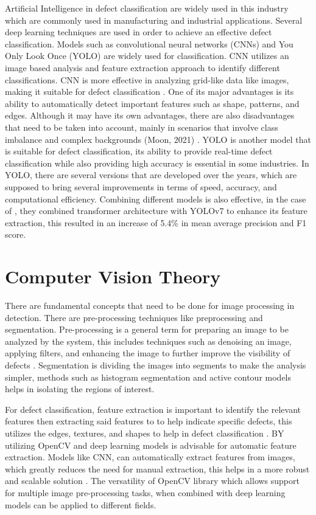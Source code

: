 Artificial Intelligence in defect classification are widely used in this industry which are commonly used in manufacturing and industrial applications. Several deep learning techniques are used in order to achieve an effective defect classification. Models such as convolutional neural networks (CNNs)  and You Only Look Once (YOLO) are widely used for classification. CNN utilizes an image based analysis and feature extraction approach to identify different classifications. CNN is more effective in analyzing grid-like data like images, making it suitable for defect classification \cite{Das_Hollander_Suliman_2019}. One of its major advantages is its ability to automatically detect important features such as shape, patterns, and edges. Although it may have its own advantages, there are also disadvantages that need to be taken into account, mainly in scenarios that involve class imbalance and complex backgrounds (Moon, 2021) . YOLO is another model that is suitable for defect classification, its ability to provide real-time defect classification while also providing high accuracy is essential in some industries. In YOLO, there are several versions that are developed over the years, which are supposed to bring several improvements in terms of speed, accuracy, and computational efficiency. Combining different models is also effective, in the case of \cite{Deepti_Prabadevi_2024}, they combined transformer architecture with YOLOv7 to enhance its feature extraction, this resulted in an increase of 5.4\% in mean average precision and F1 score. 

\section{Computer Vision Theory}

There are fundamental concepts that need to be done for image processing in detection. There are pre-processing techniques like preprocessing and segmentation. Pre-processing is a general term for preparing an image to be analyzed by the system, this includes techniques such as denoising an image, applying filters, and enhancing the image to further improve the visibility of defects \cite{Lee_Tai_2020} . Segmentation is dividing the images into segments to make the analysis simpler, methods such as histogram segmentation and active contour models helps in isolating the regions of interest. 

For defect classification, feature extraction is important to identify the relevant features then extracting said features to to help indicate specific defects, this utilizes the edges, textures, and shapes to help in defect classification \cite{Wu_Hao_Song_2024}.  BY utilizing OpenCV and deep learning models is advisable for automatic feature extraction. Models like CNN, can automatically extract features from images, which greatly reduces the need for manual extraction, this helps in a more robust and scalable solution \cite{Bali_Tyagi_2020}. The versatility of OpenCV library which allows support for multiple image pre-processing tasks, when combined with deep learning models can be applied to different fields. 

